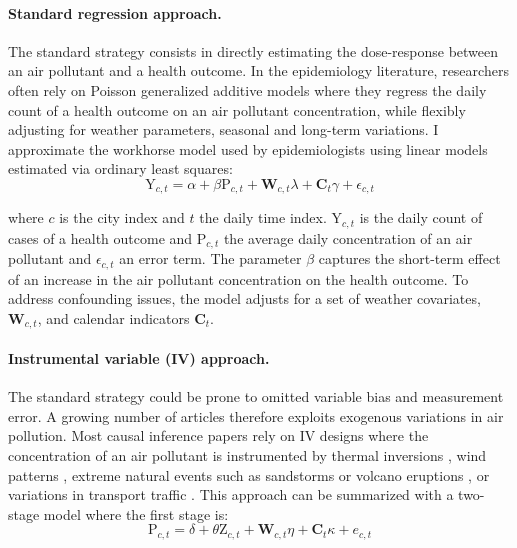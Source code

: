 \documentclass[12pt]{article}
\begin{document}
        \begin{sloppypar}
        \paragraph{Standard regression approach.} The standard strategy consists in directly estimating the dose-response between an air pollutant and a health outcome. In the epidemiology literature, researchers often rely on Poisson generalized additive models where they regress the daily count of a health outcome on an air pollutant concentration, while flexibly adjusting for weather parameters, seasonal and long-term variations. I approximate the workhorse model used by epidemiologists using linear models estimated via ordinary least squares:
        ~
        \begin{equation}
            \text{Y}_{c,t} = \alpha + \beta\text{P}_{c,t} + \textbf{W}_{c,t}\lambda + \textbf{C}_{t}\gamma + \epsilon_{c,t}
        \end{equation}
        \end{sloppypar}
        
        \noindent where $c$ is the city index and $t$ the daily time index. $\text{Y}_{c,t}$ is the daily count of cases of a health outcome and $\text{P}_{c,t}$ the average daily concentration of an air pollutant and $\epsilon_{c,t}$ an error term. The parameter $\beta$ captures the short-term effect of an increase in the air pollutant concentration on the health outcome. To address confounding issues, the model adjusts for a set of weather covariates,  $\textbf{W}_{c,t}$, and calendar indicators $\textbf{C}_{t}$. 
        
        \begin{sloppypar}
        \paragraph{Instrumental variable (IV) approach.} The standard strategy could be prone to omitted variable bias and measurement error. A growing number of articles therefore exploits exogenous variations in air pollution. Most causal inference papers rely on IV designs where the concentration of an air pollutant is instrumented by thermal inversions \citep{arceo_does_2016}, wind patterns \citep{schwartz_national_2018, deryugina_mortality_2019}, extreme natural events such as sandstorms or volcano eruptions \citep{ebenstein_particulate_2015, halliday_vog_2019}, or variations in transport traffic \citep{moretti_pollution_2011, knittel_caution_2016, schlenker_airports_2016}. This approach can be summarized with a two-stage model where the first stage is: 
        ~
        \begin{equation}
        \text{P}_{c,t} = \delta + \theta\text{Z}_{c,t} + \textbf{W}_{c,t}\eta + \textbf{C}_{t}\kappa + e_{c,t}
        \end{equation}
        \end{sloppypar}
        
\end{document}
